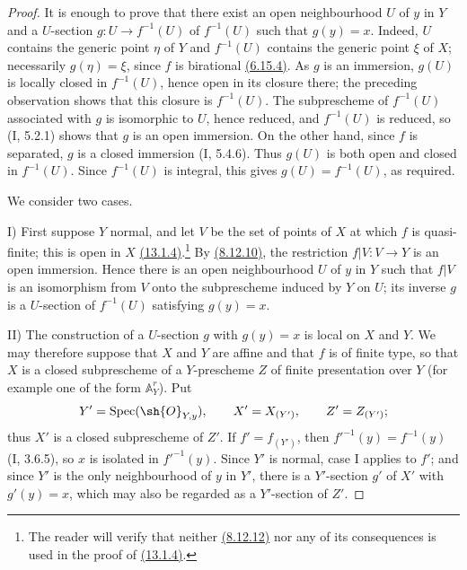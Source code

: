 \begin{proof}
It is enough to prove that there exist an open neighbourhood $U$ of
$y$ in $Y$ and a $U$-section $g:U\to f^{-1}(U)$ of $f^{-1}(U)$ such
that $g(y)=x$.  Indeed, $U$ contains the generic point $\eta$ of $Y$
and $f^{-1}(U)$ contains the generic point $\xi$ of $X$; necessarily
$g(\eta)=\xi$, since $f$ is birational {\hyperlink{ega4.c04.statement.6-15-4}{(6.15.4)}}.  As $g$ is an
immersion, $g(U)$ is locally closed in $f^{-1}(U)$, hence open in its
closure there; the preceding observation shows that this closure is
$f^{-1}(U)$.  The subprescheme of $f^{-1}(U)$ associated with $g$ is
isomorphic to $U$, hence reduced, and $f^{-1}(U)$ is reduced, so (I,
5.2.1) shows that $g$ is an open immersion.  On the other hand, since
$f$ is separated, $g$ is a closed immersion (I, 5.4.6).  Thus $g(U)$
is both open and closed in $f^{-1}(U)$.  Since $f^{-1}(U)$ is integral,
this gives $g(U)=f^{-1}(U)$, as required.

We consider two cases.

\textup{I)} First suppose $Y$ normal, and let $V$ be the set of points
of $X$ at which $f$ is quasi-finite; this is open in $X$ {\hyperlink{ega4.c04.cor.13-1-4}{(13.1.4)}}.\footnote{The
reader will verify that neither {\hyperlink{ega4.c04.cor.8-12-12}{(8.12.12)}} nor any of its consequences is
used in the proof of {\hyperlink{ega4.c04.cor.13-1-4}{(13.1.4)}}.}  By {\hyperlink{ega4.c04.cor.8-12-10}{(8.12.10)}},
the restriction
$f|V:V\to Y$ is an open immersion.  Hence there is an open
neighbourhood $U$ of $y$ in $Y$ such that $f|V$ is an isomorphism from
$V$ onto the subprescheme induced by $Y$ on $U$; its inverse $g$ is a
$U$-section of $f^{-1}(U)$ satisfying $g(y)=x$.

\textup{II)} The construction of a $U$-section $g$ with $g(y)=x$ is
local on $X$ and $Y$.  We may therefore suppose that $X$ and $Y$ are
affine and that $f$ is of finite type, so that $X$ is a closed
subprescheme of a $Y$-prescheme $Z$ of finite presentation over $Y$
(for example one of the form $\mathbb A_Y^r$).  Put
\[
 Y'=\operatorname{Spec}(\sh{O}_{Y,y}),\qquad
 X'=X_{(Y')},\qquad Z'=Z_{(Y')};
\]
thus $X'$ is a closed subprescheme of $Z'$.  If $f'=f_{(Y')}$, then
$f'^{-1}(y)=f^{-1}(y)$ (I, 3.6.5), so $x$ is isolated in
$f'^{-1}(y)$.  Since $Y'$ is normal, case I applies to $f'$; and since
$Y'$ is the only neighbourhood of $y$ in $Y'$, there is a $Y'$-section
$g'$ of $X'$ with $g'(y)=x$, which may also be regarded as a
$Y'$-section of $Z'$.


\end{proof}
